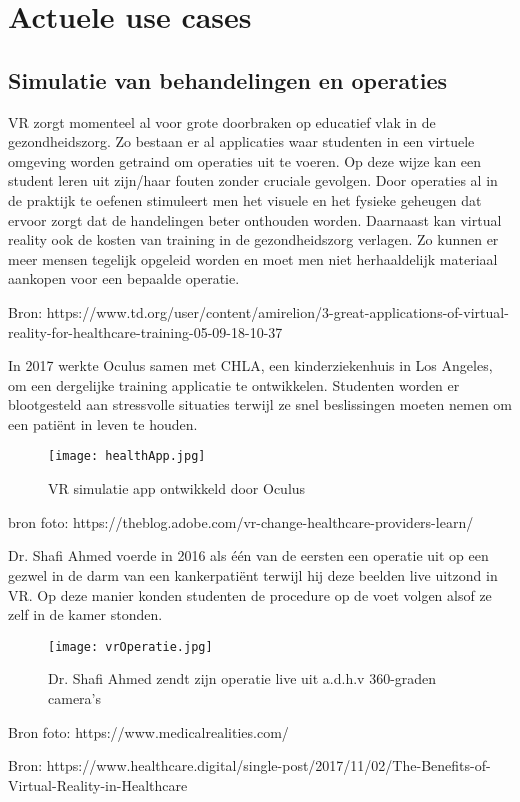 \section{Actuele use cases}
\subsection{Simulatie van behandelingen en operaties}
VR zorgt momenteel al voor grote doorbraken op educatief vlak in de gezondheidszorg. Zo bestaan er al applicaties waar studenten in een virtuele omgeving worden getraind om operaties uit te voeren. Op deze wijze kan een student leren uit zijn/haar fouten zonder cruciale gevolgen. Door operaties al in de praktijk te oefenen stimuleert men het visuele en het fysieke geheugen dat ervoor zorgt dat de handelingen beter onthouden worden. Daarnaast kan virtual reality ook de kosten van training in de gezondheidszorg verlagen. Zo kunnen er meer mensen tegelijk opgeleid worden en moet men niet herhaaldelijk materiaal aankopen voor een bepaalde operatie.

Bron: https://www.td.org/user/content/amirelion/3-great-applications-of-virtual-reality-for-healthcare-training-05-09-18-10-37

In 2017 werkte Oculus samen met CHLA, een kinderziekenhuis in Los Angeles, om een dergelijke training applicatie te ontwikkelen. Studenten worden er blootgesteld aan stressvolle situaties terwijl ze snel beslissingen moeten nemen om een patiënt in leven te houden.

\begin{figure}[h]
	\centering
	\texttt{[image: healthApp.jpg]}
	\caption{VR simulatie app ontwikkeld door Oculus}
\end{figure}
bron foto: https://theblog.adobe.com/vr-change-healthcare-providers-learn/

Dr. Shafi Ahmed voerde in 2016  als één van de eersten een operatie uit op een gezwel in de darm van een kankerpatiënt terwijl hij deze beelden live uitzond in VR. Op deze manier konden studenten de procedure op de voet volgen alsof ze zelf in de kamer stonden.

\begin{figure}[h]
	\centering
	\texttt{[image: vrOperatie.jpg]}
	\caption{Dr. Shafi Ahmed zendt zijn operatie live uit a.d.h.v 360-graden camera's}
\end{figure}

Bron foto: https://www.medicalrealities.com/

Bron: https://www.healthcare.digital/single-post/2017/11/02/The-Benefits-of-Virtual-Reality-in-Healthcare

